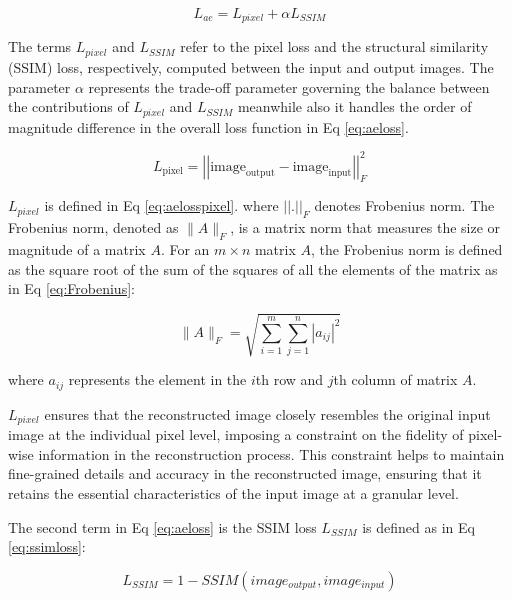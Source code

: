 \begin{equation}\label{eq:aeloss}
    L_{ae} = L_{pixel} + \alpha  L_{SSIM}
\end{equation}

The terms $L_{pixel}$ and $L_{SSIM}$ refer to the pixel loss and the structural similarity (SSIM) loss, respectively, computed between the input and output images. The parameter $\alpha$ represents the trade-off parameter governing the balance between the contributions of $L_{pixel}$ and $L_{SSIM}$ meanwhile also it handles the order of magnitude difference in the overall loss function in Eq \ref{eq:aeloss}. 

\begin{equation}\label{eq:aelosspixel}
    L_{\text{pixel}} = \left\lvert \left\lvert\text{image}_{\text{output}} - \text{image}_{\text{input}} \right\rvert \right\rvert _{F}^{2}
\end{equation}

$L_{pixel}$ is defined in Eq \ref{eq:aelosspixel}. where $\left\lvert \left\lvert\text{.} \right\rvert \right\rvert _{F}$ denotes Frobenius norm. The Frobenius norm, denoted as $\|A\|_F$, is a matrix norm that measures the size or magnitude of a matrix $A$. For an $m \times n$ matrix $A$, the Frobenius norm is defined as the square root of the sum of the squares of all the elements of the matrix as in Eq \ref{eq:Frobenius}:

\begin{equation}\label{eq:Frobenius}
    \|A\|_F = \sqrt{\sum_{i=1}^{m} \sum_{j=1}^{n} |a_{ij}|^2}
\end{equation}

where $a_{ij}$ represents the element in the $i$th row and $j$th column of matrix $A$.

$L_{pixel}$ ensures that the reconstructed image closely resembles the original input image at the individual pixel level, imposing a constraint on the fidelity of pixel-wise information in the reconstruction process. This constraint helps to maintain fine-grained details and accuracy in the reconstructed image, ensuring that it retains the essential characteristics of the input image at a granular level. 

The second term in Eq \ref{eq:aeloss} is the SSIM loss $L_{SSIM}$ is defined as in Eq \ref{eq:ssimloss}:

\begin{equation}\label{eq:ssimloss}
    L_{SSIM} = 1- SSIM(image_{output},image_{input})
\end{equation}

